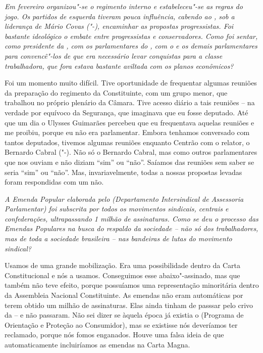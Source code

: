 \medskip

\noindent\emph{Em fevereiro organizou"-se o regimento interno e estabeleceu"-se
as regras do jogo. Os partidos de esquerda tiveram pouca influência,
cabendo ao , sob a liderança de Mário
Covas ("-), encaminhar as
propostas progressistas. Foi bastante ideológico o embate entre
progressistas e conservadores. Como foi sentar, como presidente da ,
com os parlamentares do , com o  e os demais parlamentares para
convencê"-los de que era necessário levar conquistas para a classe
trabalhadora, que fora estava bastante aviltada com os planos
econômicos?}

Foi um momento muito difícil. Tive oportunidade de
frequentar algumas reuniões da preparação do regimento da Constituinte,
com um grupo menor, que trabalhou no próprio plenário da Câmara. Tive
acesso diário a tais reuniões -- na verdade por equívoco da Segurança,
que imaginava que eu fosse deputado. Até que um dia o Ulysses Guimarães
percebeu que eu frequentava aquelas reuniões e me proibiu, porque eu não
era parlamentar. Embora tenhamos conversado com tantos deputados,
tivemos algumas reuniões enquanto Centrão com o relator, o Bernardo
Cabral ("-). Não só o Bernardo Cabral, mas como outros
parlamentares que nos ouviam e não diziam ``sim'' ou ``não''. Saíamos
das reuniões sem saber se seria ``sim'' ou ``não''. Mas,
invariavelmente, todas a nossas propostas levadas foram respondidas com
um não.

\medskip

\noindent\emph{A Emenda Popular elaborada pelo  (Departamento
Intersindical de Assessoria Parlamentar) foi subscrita por
todos os movimentos sindicais, centrais e confederações, ultrapassando 1
milhão de assinaturas. Como se deu o processo das Emendas Populares na
busca do respaldo da sociedade -- não só dos trabalhadores, mas de toda
a sociedade brasileira -- nas bandeiras de lutas do movimento sindical?}

Usamos de uma grande mobilização. Era uma
possibilidade dentro da Carta Constitucional e nós a usamos. Conseguimos
esse abaixo"-assinado, mas que também não teve efeito, porque possuíamos
uma representação minoritária dentro da Assembleia Nacional
Constituinte. As emendas não eram automáticas por terem obtido um milhão
de assinaturas. Elas ainda tinham de passsar pelo crivo da  -- e não
passaram. Não sei dizer se àquela época já existia o  (Programa de
Orientação e Proteção ao Consumidor), mas se existisse nós deveríamos
ter reclamado, porque nós fomos enganados. Houve uma falsa ideia de que
automaticamente incluiríamos as emendas na Carta Magna.

